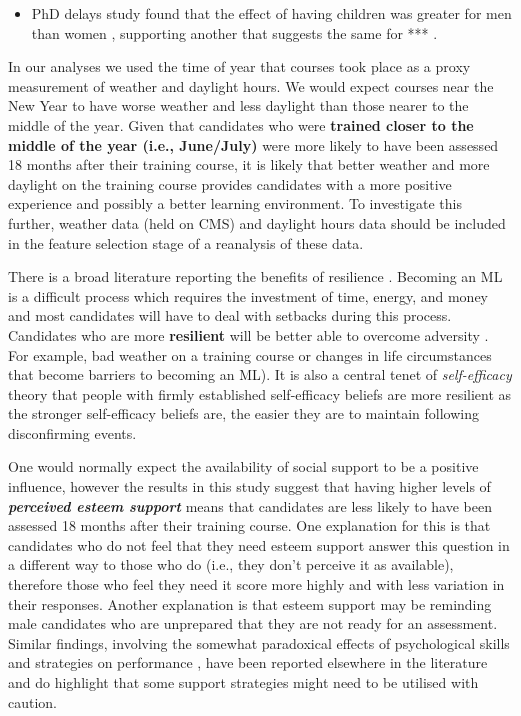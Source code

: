 \documentclass[a4paper,]{book}
\providecommand{\tightlist}{%
  \setlength{\itemsep}{0pt}\setlength{\parskip}{0pt}}
\begin{document}
\begin{itemize}
\tightlist
\item
  PhD delays study found that the effect of having children was greater for men than women \citep{VandeSchoot2013a}, supporting another that suggests the same for *** \citep{Waite1995}.
\end{itemize}

In our analyses we used the time of year that courses took place as a proxy measurement of weather and daylight hours. We would expect courses near the New Year to have worse weather and less daylight than those nearer to the middle of the year. Given that candidates who were \textbf{trained closer to the middle of the year (i.e., June/July)} were more likely to have been assessed 18 months after their training course, it is likely that better weather and more daylight on the training course provides candidates with a more positive experience and possibly a better learning environment. To investigate this further, weather data (held on CMS) and daylight hours data should be included in the feature selection stage of a reanalysis of these data.

There is a broad literature reporting the benefits of resilience \citep[e.g.,][]{Seery2016}. Becoming an ML is a difficult process which requires the investment of time, energy, and money and most candidates will have to deal with setbacks during this process. Candidates who are more \textbf{resilient} will be better able to overcome adversity \citep{Smith2008}. For example, bad weather on a training course or changes in life circumstances that become barriers to becoming an ML). It is also a central tenet of \emph{self-efficacy} theory that people with firmly established self-efficacy beliefs are more resilient \citep{Bandura1997} as the stronger self-efficacy beliefs are, the easier they are to maintain following disconfirming events.

One would normally expect the availability of social support to be a positive influence, however the results in this study suggest that having higher levels of \emph{\textbf{perceived esteem support}} means that candidates are less likely to have been assessed 18 months after their training course. One explanation for this is that candidates who do not feel that they need esteem support answer this question in a different way to those who do (i.e., they don't perceive it as available), therefore those who feel they need it score more highly and with less variation in their responses. Another explanation is that esteem support may be reminding male candidates who are unprepared that they are not ready for an assessment. Similar findings, involving the somewhat paradoxical effects of psychological skills and strategies on performance \citep{Roberts2013}, have been reported elsewhere in the literature and do highlight that some support strategies might need to be utilised with caution.
\end{document}
